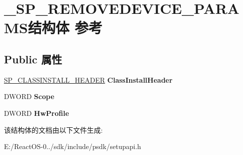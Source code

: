 \hypertarget{struct___s_p___r_e_m_o_v_e_d_e_v_i_c_e___p_a_r_a_m_s}{}\section{\+\_\+\+S\+P\+\_\+\+R\+E\+M\+O\+V\+E\+D\+E\+V\+I\+C\+E\+\_\+\+P\+A\+R\+A\+M\+S结构体 参考}
\label{struct___s_p___r_e_m_o_v_e_d_e_v_i_c_e___p_a_r_a_m_s}
\subsection*{Public 属性}
\begin{DoxyCompactItemize}
\item 
\mbox{\label{struct___s_p___r_e_m_o_v_e_d_e_v_i_c_e___p_a_r_a_m_s_a524008e7cdf7e44fce25dbfcd1fdf122}} 
\hyperlink{struct___s_p___c_l_a_s_s_i_n_s_t_a_l_l___h_e_a_d_e_r}{S\+P\+\_\+\+C\+L\+A\+S\+S\+I\+N\+S\+T\+A\+L\+L\+\_\+\+H\+E\+A\+D\+ER} {\bfseries Class\+Install\+Header}
\item 
\mbox{\label{struct___s_p___r_e_m_o_v_e_d_e_v_i_c_e___p_a_r_a_m_s_a270151648469d7fe0c27e3fa2884c65d}} 
D\+W\+O\+RD {\bfseries Scope}
\item 
\mbox{\label{struct___s_p___r_e_m_o_v_e_d_e_v_i_c_e___p_a_r_a_m_s_a5812601ce72cc0125ea5cb76e49e06e6}} 
D\+W\+O\+RD {\bfseries Hw\+Profile}
\end{DoxyCompactItemize}


该结构体的文档由以下文件生成\+:\begin{DoxyCompactItemize}
\item 
E\+:/\+React\+O\+S-\/0../sdk/include/psdk/setupapi.\+h\end{DoxyCompactItemize}
